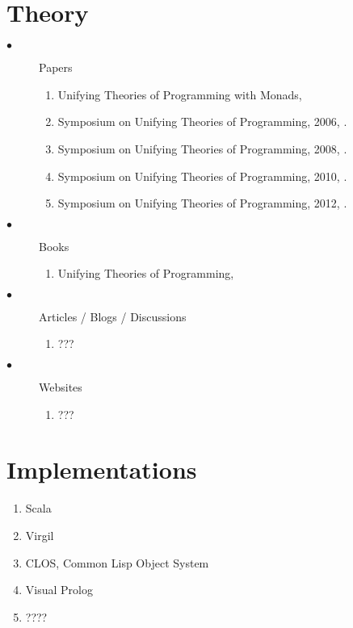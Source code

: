 \documentclass[thesis-solanki.tex]{subfiles}
\begin{document}
\section{Theory}
\begin{description}

\item[$\bullet$] Papers
\begin{enumerate}
\item Unifying Theories of Programming with Monads, \cite{gibbons2013unifying}

\item Symposium on Unifying Theories of Programming, 2006, \cite{DBLP:conf/utp/2006}.

\item Symposium on Unifying Theories of Programming, 2008, \cite{DBLP:conf/utp/2008}.

\item Symposium on Unifying Theories of Programming, 2010, \cite{DBLP:conf/utp/2010}.

\item Symposium on Unifying Theories of Programming, 2012, \cite{DBLP:conf/utp/2012}.

\end{enumerate}

\item[$\bullet$] Books
\begin{enumerate}
\item Unifying Theories of Programming, \cite{hoare1998unifying}
\end{enumerate}

\item[$\bullet$] Articles / Blogs / Discussions
\begin{enumerate}
\item ???
\end{enumerate}

\item[$\bullet$] Websites
\begin{enumerate}
\item ???
\end{enumerate}

\end{description}


\section{Implementations}
\begin{enumerate}
\item Scala
\item Virgil
\item CLOS, Common Lisp Object System
\item Visual Prolog
\item ????
\end{enumerate}
\end{document}

